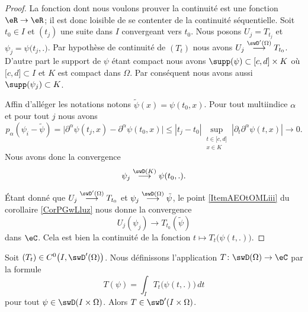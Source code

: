 \begin{proof}
    La fonction dont nous voulons prouver la continuité est une fonction \( \eR\to\eR\); il est donc loisible de se contenter de la continuité séquentielle. Soit \( t_0\in I\) et \( (t_j)\) une suite dans \( I\) convergeant vers \( t_0\). Nous posons \( U_j=T_{t_j}\) et \( \psi_j=\psi\big( t_j,. \big)\). Par hypothèse de continuité de \( (T_t)\) nous avons \( U_j\stackrel{\swD'(\Omega)}{\longrightarrow}T_{t_0}\). D'autre part le support de \( \psi\) étant compact nous avons \( \supp(\psi)\subset \mathopen[ c , d \mathclose]\times K\) où \( \mathopen[ c , d \mathclose]\subset I\) et \( K\) est compact dans \( \Omega\). Par conséquent nous avons aussi \( \supp(\psi_j)\subset K\).

    Affin d'alléger les notations notons \( \tilde \psi(x)=\psi(t_0,x)\). Pour tout multiindice \( \alpha\) et pour tout \( j\) nous avons
    \begin{equation}
        p_{\alpha}(\psi_i-\tilde \psi)=\Big|  \partial^{\alpha}\psi(t_j,x)-\partial^{\alpha}\psi(t_0,x)    \Big|\leq | t_j-t_0 |\sup_{\substack{t\in\mathopen[ c , d \mathclose]\\x\in K}}| \partial_t\partial^{\alpha}\psi(t,x) |\to 0.
    \end{equation}
    Nous avons donc la convergence
    \begin{equation}
        \psi_j\stackrel{\swD(K)}{\longrightarrow}\psi(t_0,.).
    \end{equation}
    
    Étant donné que \( U_j\stackrel{\swD'(\Omega)}{\longrightarrow}T_{t_0}\) et \( \psi_j\stackrel{\swD(\Omega)}{\longrightarrow}\tilde \psi\), le point \ref{ItemAEOtOMLiii} du corollaire \ref{CorPGwLluz} nous donne la convergence
    \begin{equation}
        U_j(\psi_j)\to T_{t_0}(\tilde \psi)
    \end{equation}
    dans \( \eC\). Cela est bien la continuité de la fonction \( t\mapsto T_t\big( \psi(t,.) \big)\).
    
\end{proof}

\begin{proposition} \label{PropLKtBsVi}
    Soit \( (T_t)\in C^0\big( I,\swD'(\Omega) \big)\). Nous définissons l'application \( T\colon \swD(\Omega)\to \eC\) par la formule
    \begin{equation}
       T(\psi)=\int_I T_t\big( \psi(t,.) \big)\,dt
    \end{equation} 
    pour tout \( \psi\in\swD(I\times \Omega)\). Alors \( T\in \swD'(I\times \Omega)\).
\end{proposition}

